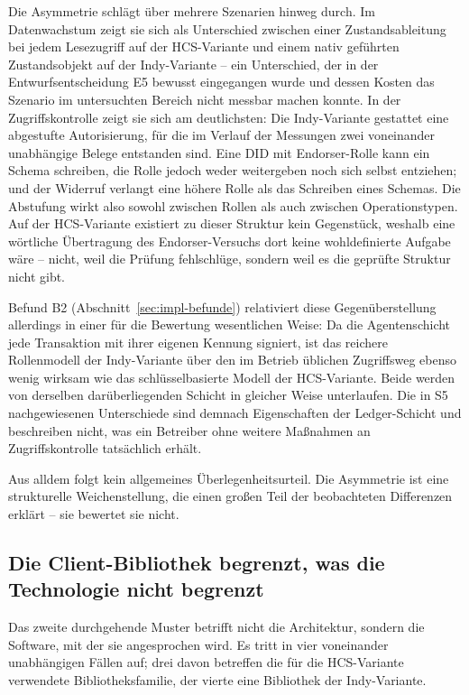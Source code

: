 Die Asymmetrie schlägt über mehrere Szenarien hinweg durch. Im Datenwachstum zeigt sie sich als Unterschied zwischen einer Zustandsableitung bei jedem Lesezugriff auf der HCS-Variante und einem nativ geführten Zustandsobjekt auf der Indy-Variante -- ein Unterschied, der in der Entwurfsentscheidung E5 bewusst eingegangen wurde und dessen Kosten das Szenario im untersuchten Bereich nicht messbar machen konnte. In der Zugriffskontrolle zeigt sie sich am deutlichsten: Die Indy-Variante gestattet eine abgestufte Autorisierung, für die im Verlauf der Messungen zwei voneinander unabhängige Belege entstanden sind. Eine DID mit Endorser-Rolle kann ein Schema schreiben, die Rolle jedoch weder weitergeben noch sich selbst entziehen; und der Widerruf verlangt eine höhere Rolle als das Schreiben eines Schemas. Die Abstufung wirkt also sowohl zwischen Rollen als auch zwischen Operationstypen. Auf der HCS-Variante existiert zu dieser Struktur kein Gegenstück, weshalb eine wörtliche Übertragung des Endorser-Versuchs dort keine wohldefinierte Aufgabe wäre -- nicht, weil die Prüfung fehlschlüge, sondern weil es die geprüfte Struktur nicht gibt.

Befund B2 (Abschnitt~\ref{sec:impl-befunde}) relativiert diese Gegenüberstellung allerdings in einer für die Bewertung wesentlichen Weise: Da die Agentenschicht jede Transaktion mit ihrer eigenen Kennung signiert, ist das reichere Rollenmodell der Indy-Variante über den im Betrieb üblichen Zugriffsweg ebenso wenig wirksam wie das schlüsselbasierte Modell der HCS-Variante. Beide werden von derselben darüberliegenden Schicht in gleicher Weise unterlaufen. Die in S5 nachgewiesenen Unterschiede sind demnach Eigenschaften der Ledger-Schicht und beschreiben nicht, was ein Betreiber ohne weitere Maßnahmen an Zugriffskontrolle tatsächlich erhält.

Aus alldem folgt kein allgemeines Überlegenheitsurteil. Die Asymmetrie ist eine strukturelle Weichenstellung, die einen großen Teil der beobachteten Differenzen erklärt -- sie bewertet sie nicht.

\subsection{Die Client-Bibliothek begrenzt, was die Technologie nicht begrenzt}
\label{sec:results-bibliotheksgrenzen}

Das zweite durchgehende Muster betrifft nicht die Architektur, sondern die Software, mit der sie angesprochen wird. Es tritt in vier voneinander unabhängigen Fällen auf; drei davon betreffen die für die HCS-Variante verwendete Bibliotheksfamilie, der vierte eine Bibliothek der Indy-Variante.

